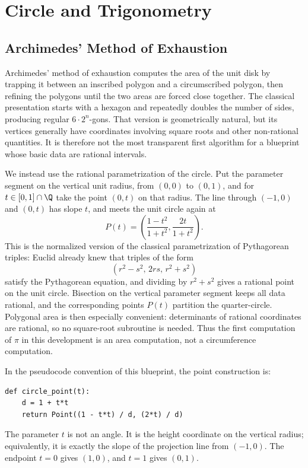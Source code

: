\chapter{Circle and Trigonometry}
\label{ch:rational-circle-trigonometry}

\section{Archimedes' Method of Exhaustion}

Archimedes' method of exhaustion computes the area of the unit disk by
trapping it between an inscribed polygon and a circumscribed polygon, then
refining the polygons until the two areas are forced close together.  The
classical presentation starts with a hexagon and repeatedly doubles the number
of sides, producing regular \(6\cdot2^n\)-gons.  That version is geometrically
natural, but its vertices generally have coordinates involving square roots
and other non-rational quantities.  It is therefore not the most transparent
first algorithm for a blueprint whose basic data are rational intervals.

We instead use the rational parametrization of the circle.  Put the parameter
segment on the vertical unit radius, from \((0,0)\) to \((0,1)\), and for
\(t\in[0,1]\cap\Q\) take the point \((0,t)\) on that radius.  The line
through \((-1,0)\) and \((0,t)\) has slope \(t\), and meets the unit circle
again at
\[
  P(t)=
  \left(
    \frac{1-t^2}{1+t^2},
    \frac{2t}{1+t^2}
  \right).
\]
This is the normalized version of the classical parametrization of
Pythagorean triples: Euclid already knew that triples of the form
\[
  (r^2-s^2,\,2rs,\,r^2+s^2)
\]
satisfy the Pythagorean equation, and dividing by \(r^2+s^2\) gives a rational
point on the unit circle.  Bisection on the vertical parameter segment keeps
all data rational, and the corresponding points \(P(t)\) partition the
quarter-circle.  Polygonal area is then especially convenient: determinants
of rational coordinates are rational, so no square-root subroutine is needed.
Thus the first computation of \(\pi\) in this development is an area
computation, not a circumference computation.

\begin{remark}
\label{rem:rational-circle-point}
In the pseudocode convention of this blueprint, the point construction is:
\begin{verbatim}
def circle_point(t):
    d = 1 + t*t
    return Point((1 - t*t) / d, (2*t) / d)
\end{verbatim}
The parameter \(t\) is not an angle.  It is the height coordinate on the
vertical radius; equivalently, it is exactly the slope of the projection line
from \((-1,0)\).  The endpoint \(t=0\) gives \((1,0)\), and \(t=1\) gives
\((0,1)\).
\end{remark}

